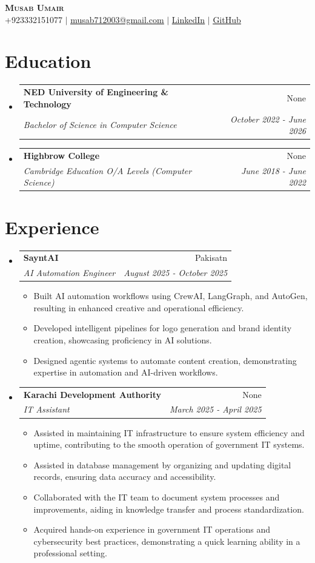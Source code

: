 \documentclass[letterpaper,11pt]{article}
\makeatletter
\newcommand{\resumeItem}[1]{
  \item\small{
    {#1 \vspace{-2pt}}
  }
}
\newcommand{\resumeSubheading}[4]{
  \vspace{-2pt}\item
    \begin{tabular*}{0.97\textwidth}[t]{l@{\extracolsep{\fill}}r}
      \textbf{#1} & #2 \\
      \textit{\small#3} & \textit{\small #4} \\
    \end{tabular*}\vspace{-7pt}
}
\newcommand{\resumeSubHeadingListStart}{\begin{itemize}[leftmargin=0.15in, label={}]}
\newcommand{\resumeSubHeadingListEnd}{\end{itemize}}
\newcommand{\resumeItemListStart}{\begin{itemize}}
\newcommand{\resumeItemListEnd}{\end{itemize}\vspace{-5pt}}
\makeatother
\begin{document}
\begin{center}
    \textbf{\Huge \scshape Musab Umair} \\ \vspace{1pt}
    \small +923332151077 $|$ \href{mailto:musab712003@gmail.com}{\underline{musab712003@gmail.com}} $|$ 
    \href{https://www.linkedin.com/in/musab-umair1}{\underline{LinkedIn}} $|$
    \href{https://github.com/Musab712}{\underline{GitHub}}
\end{center}


\section{Education}
  \resumeSubHeadingListStart
        \resumeSubheading
      {NED University of Engineering \& Technology}{None}
      {Bachelor of Science in Computer Science}{October 2022 - June 2026}
        \resumeSubheading
      {Highbrow College}{None}
      {Cambridge Education O/A Levels (Computer Science)}{June 2018 - June 2022}
      \resumeSubHeadingListEnd


\section{Experience}
  \resumeSubHeadingListStart
        \resumeSubheading
      {SayntAI}{Pakisatn}
      {AI Automation Engineer}{August 2025 - October 2025}
      \resumeItemListStart
                \resumeItem{Built AI automation workflows using CrewAI, LangGraph, and AutoGen, resulting in enhanced creative and operational efficiency.}
                \resumeItem{Developed intelligent pipelines for logo generation and brand identity creation, showcasing proficiency in AI solutions.}
                \resumeItem{Designed agentic systems to automate content creation, demonstrating expertise in automation and AI-driven workflows.}
              \resumeItemListEnd
        \resumeSubheading
      {Karachi Development Authority}{None}
      {IT Assistant}{March 2025 - April 2025}
      \resumeItemListStart
                \resumeItem{Assisted in maintaining IT infrastructure to ensure system efficiency and uptime, contributing to the smooth operation of government IT systems.}
                \resumeItem{Assisted in database management by organizing and updating digital records, ensuring data accuracy and accessibility.}
                \resumeItem{Collaborated with the IT team to document system processes and improvements, aiding in knowledge transfer and process standardization.}
                \resumeItem{Acquired hands-on experience in government IT operations and cybersecurity best practices, demonstrating a quick learning ability in a professional setting.}
              \resumeItemListEnd
      \resumeSubHeadingListEnd
\end{document}
